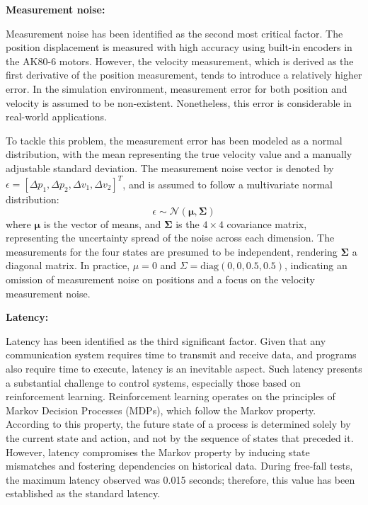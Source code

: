 \textbf{Measurement noise:}

Measurement noise has been identified as the second most critical factor. The position displacement is measured with high accuracy using built-in encoders in the AK80-6 motors. However, the velocity measurement, which is derived as the first derivative of the position measurement, tends to introduce a relatively higher error. In the simulation environment, measurement error for both position and velocity is assumed to be non-existent. Nonetheless, this error is considerable in real-world applications.

To tackle this problem, the measurement error has been modeled as a normal distribution, with the mean representing the true velocity value and a manually adjustable standard deviation. The measurement noise vector is denoted by \(\epsilon = [\Delta p_1, \Delta p_2, \Delta v_1, \Delta v_2]^T\), and is assumed to follow a multivariate normal distribution:
\begin{equation}
\epsilon \sim \mathcal{N}(\boldsymbol{\mu}, \boldsymbol{\Sigma})
\end{equation}
where \(\boldsymbol{\mu}\) is the vector of means, and \(\boldsymbol{\Sigma}\) is the \(4 \times 4\) covariance matrix, representing the uncertainty spread of the noise across each dimension. The measurements for the four states are presumed to be independent, rendering \(\boldsymbol{\Sigma}\) a diagonal matrix. In practice, \(\mu = 0\) and \(\Sigma = \text{diag}(0,0,0.5,0.5)\), indicating an omission of measurement noise on positions and a focus on the velocity measurement noise.

\textbf{Latency:}

Latency has been identified as the third significant factor. Given that any communication system requires time to transmit and receive data, and programs also require time to execute, latency is an inevitable aspect. Such latency presents a substantial challenge to control systems, especially those based on reinforcement learning. Reinforcement learning operates on the principles of Markov Decision Processes (MDPs), which follow the Markov property. According to this property, the future state of a process is determined solely by the current state and action, and not by the sequence of states that preceded it. However, latency compromises the Markov property by inducing state mismatches and fostering dependencies on historical data. During free-fall tests, the maximum latency observed was 0.015 seconds; therefore, this value has been established as the standard latency.

